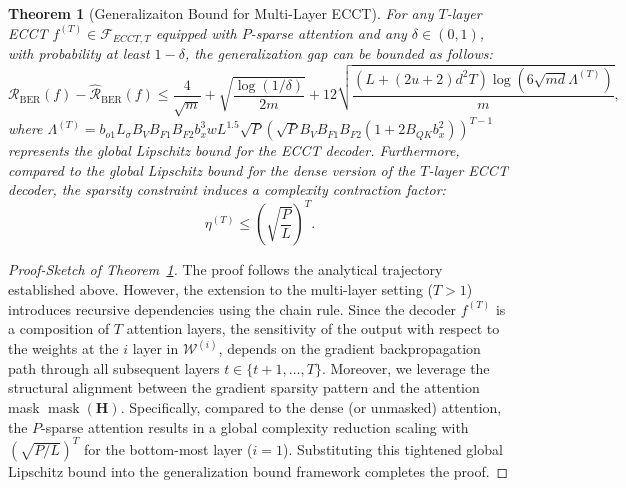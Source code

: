 \documentclass[lettersize,onecolumn]{IEEEtran}
\newtheorem{theorem}{Theorem}
\begin{document}
\begin{theorem}[Generalizaiton Bound for Multi-Layer ECCT]\label{theorem: multi-layer ecct bound}
    For any $T$-layer ECCT $f^{(T)} \in \mathcal{F}_{ECCT,T}$ equipped with $P$-sparse attention and any $\delta \in (0,1)$, with probability at least $1-\delta$, the generalization gap can be bounded as follows:
    \begin{equation}
        \mathcal{R}_{\mathrm{BER}}(f)-\hat{\mathcal{R}}_{\mathrm{BER}}(f) \leq \frac{4}{\sqrt{m}}+\sqrt{\frac{\log (1 / \delta)}{2 m}}+12 \sqrt{\frac{(L+(2 u+2) d^{2} T) \log (6 \sqrt{m d}\Lambda^{(T)}) }{m}},
    \end{equation}
    where $\Lambda^{(T)}=b_{o1}L_{\sigma}B_{V}B_{F1}B_{F2}b_{x}^{3}wL^{1.5}\sqrt{P}\left(\sqrt{P}B_{V}B_{F1}B_{F2}(1+2B_{QK}b_{x}^{2})\right)^{T-1}$ represents the global Lipschitz bound for the ECCT decoder. Furthermore, compared to the global Lipschitz bound for the dense version of the $T$-layer ECCT decoder, the sparsity constraint induces a complexity contraction factor:
    \begin{equation}
        \eta^{(T)} \leq \left(\sqrt{\frac{P}{L}}\right)^{T}.
    \end{equation}
\end{theorem}

\begin{proof}[Proof-Sketch of Theorem~\ref{theorem: multi-layer ecct bound}]
    The proof follows the analytical trajectory established above. However, the extension to the multi-layer setting ($T>1$) introduces recursive dependencies using the chain rule. Since the decoder $f^{(T)}$ is a composition of $T$ attention layers, the sensitivity of the output with respect to the weights at the $i$ layer in $\mathcal{W}^{(i)}$, depends on the gradient backpropagation path through all subsequent layers $t \in \{t+1, \ldots, T\}$. Moreover, we leverage the structural alignment between the gradient sparsity pattern and the attention mask $\operatorname{mask}(\mathbf{H})$. Specifically, compared to the dense (or unmasked) attention, the $P$-sparse attention results in a global complexity reduction scaling with $\left(\sqrt{P/L}\right)^{T}$ for the bottom-most layer ($i=1$). Substituting this tightened global Lipschitz bound into the generalization bound framework completes the proof.
\end{proof}

\end{document}
